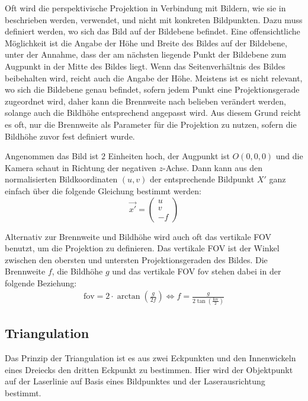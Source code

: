 \documentclass[ngerman,a4paper,parskip=half]{scrartcl}
\def \fov{\mathrm{fov}}
\begin{document}
Oft wird die perspektivische Projektion in Verbindung mit Bildern, wie sie in  beschrieben werden, verwendet, und nicht mit konkreten Bildpunkten. Dazu muss definiert werden, wo sich das Bild auf der Bildebene befindet. Eine offensichtliche Möglichkeit ist die Angabe der Höhe und Breite des Bildes auf der Bildebene, unter der Annahme, dass der am nächsten liegende Punkt der Bildebene zum Augpunkt in der Mitte des Bildes liegt. Wenn das Seitenverhältnis des Bildes beibehalten wird, reicht auch die Angabe der Höhe. Meistens ist es nicht relevant, wo sich die Bildebene genau befindet, sofern jedem Punkt eine Projektionsgerade zugeordnet wird, daher kann die Brennweite nach belieben verändert werden, solange auch die Bildhöhe entsprechend angepasst wird. Aus diesem Grund reicht es oft, nur die Brennweite als Parameter für die Projektion zu nutzen, sofern die Bildhöhe zuvor fest definiert wurde.

Angenommen das Bild ist $2$ Einheiten hoch, der Augpunkt ist $O(0,0,0)$ und die Kamera schaut in Richtung der negativen $z$-Achse. Dann kann aus den normalisierten Bildkoordinaten $(u,v)$ der entsprechende Bildpunkt $X'$ ganz einfach über die folgende Gleichung bestimmt werden:
\[ \vec{x'} = \begin{pmatrix}
u \\ v \\ -f
\end{pmatrix} \]

Alternativ zur Brennweite und Bildhöhe wird auch oft das vertikale \ac{FOV} benutzt, um die Projektion zu definieren. Das vertikale \ac{FOV} ist der Winkel zwischen den obersten und untersten Projektionsgeraden des Bildes. Die Brennweite $f$, die Bildhöhe $g$ und das vertikale \ac{FOV} $\fov$ stehen dabei in der folgende Beziehung:
\begin{align*}
	\fov = 2 \cdot \arctan \left( \frac{g}{2 f} \right)
	\Leftrightarrow f = \frac{g}{2 \tan\left(\frac{\fov}{2}\right)}
\end{align*}

\subsection{Triangulation}

Das Prinzip der Triangulation ist es aus zwei Eckpunkten und den Innenwickeln eines Dreiecks den dritten Eckpunkt zu bestimmen. Hier wird der Objektpunkt auf der Laserlinie auf Basis eines Bildpunktes und der Laserausrichtung bestimmt.
\end{document}
